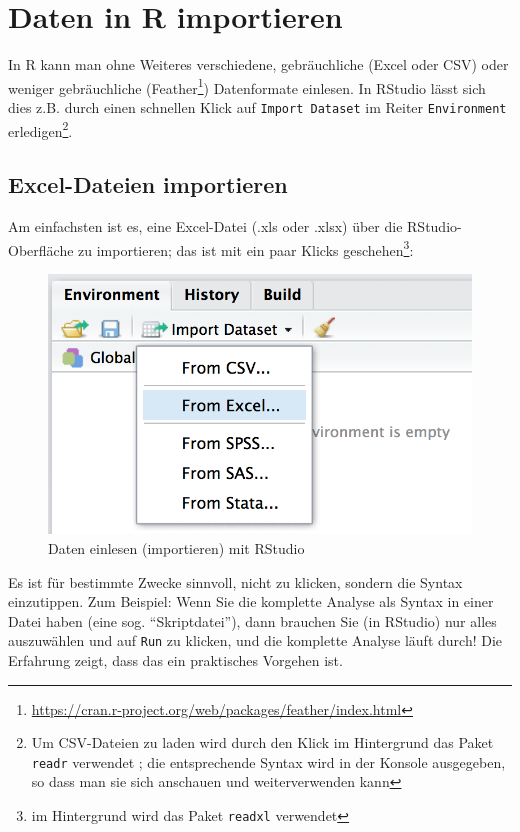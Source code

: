 \documentclass[12pt,ngerman,]{book}
\let\rmarkdownfootnote\footnote%
\def\footnote{\protect\rmarkdownfootnote}
\begin{document}
\section{Daten in R importieren}\label{daten-in-r-importieren}

In R kann man ohne Weiteres verschiedene, gebräuchliche (Excel oder CSV)
oder weniger gebräuchliche (Feather\footnote{\url{https://cran.r-project.org/web/packages/feather/index.html}})
Datenformate einlesen. In RStudio lässt sich dies z.B. durch einen
schnellen Klick auf \texttt{Import\ Dataset} im Reiter
\texttt{Environment} erledigen\footnote{Um CSV-Dateien zu laden wird
  durch den Klick im Hintergrund das Paket \texttt{readr} verwendet
  \citep{readr}; die entsprechende Syntax wird in der Konsole
  ausgegeben, so dass man sie sich anschauen und weiterverwenden kann}.

\subsection{Excel-Dateien importieren}\label{excel-dateien-importieren}

Am einfachsten ist es, eine Excel-Datei (.xls oder .xlsx) über die
RStudio-Oberfläche zu importieren; das ist mit ein paar Klicks
geschehen\footnote{im Hintergrund wird das Paket \texttt{readxl}
  verwendet}:

\begin{figure}

{\centering \includegraphics[width=0.5\linewidth]{images/import_RStudio} 

}

\caption{Daten einlesen (importieren) mit RStudio}\label{fig:data-import-RStudio}
\end{figure}

Es ist für bestimmte Zwecke sinnvoll, nicht zu klicken, sondern die
Syntax einzutippen. Zum Beispiel: Wenn Sie die komplette Analyse als
Syntax in einer Datei haben (eine sog. ``Skriptdatei''), dann brauchen
Sie (in RStudio) nur alles auszuwählen und auf \texttt{Run} zu klicken,
und die komplette Analyse läuft durch! Die Erfahrung zeigt, dass das ein
praktisches Vorgehen ist.
\end{document}
